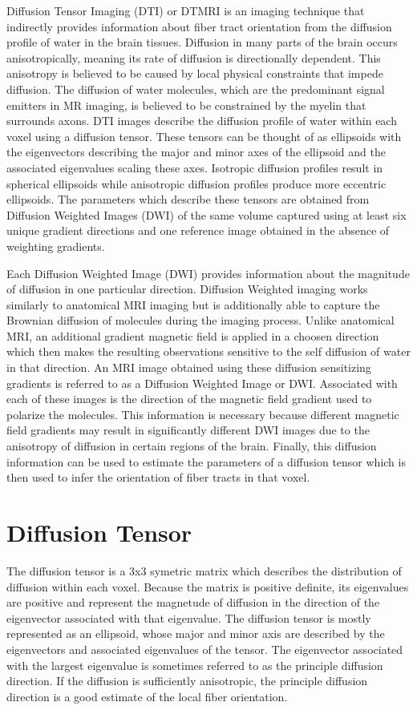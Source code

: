 Diffusion Tensor Imaging (DTI) or DTMRI is an imaging technique that indirectly provides information about fiber tract orientation from the diffusion profile of water in the brain tissues. Diffusion in many parts of the brain occurs anisotropically, meaning its rate of diffusion is directionally dependent.  This anisotropy is believed to be caused by local physical constraints that impede diffusion.  The diffusion of water molecules, which are the predominant signal emitters in MR imaging, is believed to be constrained by the myelin that surrounds axons.  DTI images describe the diffusion profile of water within each voxel using a diffusion tensor.  These tensors can be thought of as ellipsoids with the eigenvectors describing the major and minor axes of the ellipsoid and the associated eigenvalues scaling these axes.  Isotropic diffusion profiles result in spherical ellipsoids while anisotropic diffusion profiles produce more eccentric ellipsoids.  The parameters which describe these tensors are obtained from Diffusion Weighted Images (DWI) of the same volume captured using at least six unique gradient directions and one reference image obtained in the absence of weighting gradients.

Each Diffusion Weighted Image (DWI) provides information about the magnitude of diffusion in one particular direction.  Diffusion Weighted imaging works similarly to anatomical MRI imaging but is additionally able to capture the Brownian diffusion of molecules during the imaging process.  Unlike anatomical MRI, an additional gradient magnetic field is applied in a choosen direction which then makes the resulting observations sensitive to the self diffusion of water in that direction. An MRI image obtained using these diffusion sensitizing gradients is referred to as a Diffusion Weighted Image or DWI.  Associated with each of these images is the direction of the magnetic field gradient used to polarize the molecules.  This information is necessary because different magnetic field gradients may result in significantly different DWI images due to the anisotropy of diffusion in certain regions of the brain.  Finally, this diffusion information can be used to estimate the parameters of a diffusion tensor which is then used to infer the orientation of fiber tracts in that voxel.

\section{Diffusion Tensor}
The diffusion tensor is a 3x3 symetric matrix which describes the distribution of diffusion within each voxel.  Because the matrix is positive definite, its eigenvalues are positive and represent the magnetude of diffusion in the direction of the eigenvector associated with that eigenvalue.  The diffusion tensor is mostly represented as an ellipsoid, whose major and minor axis are described by the eigenvectors and associated eigenvalues of the tensor.  The eigenvector associated with the largest eigenvalue is sometimes referred to as the principle diffusion direction.  If the diffusion is sufficiently anisotropic, the principle diffusion direction is a good estimate of the local fiber orientation. %

